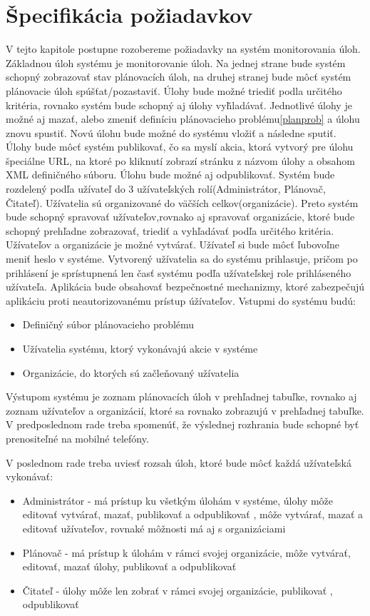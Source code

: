 \section{Špecifikácia požiadavkov}
V tejto kapitole postupne rozobereme požiadavky na systém monitorovania úloh. Základnou úloh systému je monitorovanie úloh. Na jednej strane bude systém schopný zobrazovať stav plánovacích úloh, na druhej stranej bude môcť systém plánovacie úloh spúšťat/pozastaviť. Úlohy bude možné triediť podla určitého kritéria, rovnako systém bude schopný aj úlohy vyȟladávať. Jednotlivé úlohy je možné aj mazať, alebo zmeniť definíciu plánovacieho problému\ref{planprob} a úlohu znovu spustiť. Novú úlohu bude možné do systému vložiť a následne sputiť. Úlohy bude môcť systém publikovať, čo sa myslí akcia, ktorá vytvorý pre úlohu špeciálne URL, na ktoré po kliknutí zobrazí stránku z názvom úlohy a obsahom XML definičného súboru. Úlohu bude možné aj odpublikovať.
 Systém bude rozdelený podľa užívateľ do 3 užívateľských rolí(Administrátor, Plánovač, Čitateľ). Užívatelia sú organizované do väčších celkov(organizácie). Preto systém bude schopný spravovať užívateľov,rovnako aj spravovať organizácie, ktoré bude schopný prehľadne zobrazovať, triediť a vyhľadávať podľa určitého kritéria. Užívateľov a organizácie je možné vytvárať. Užívateľ si bude môcť ľubovoľne meniť heslo v systéme. Vytvorený užívatelia sa do systému prihlasuje, pričom po prihlásení je sprístupnená len časť systému podľa užívateľskej role prihláseného užívateľa. Aplikácia bude obsahovať bezpečnostné mechanizmy, ktoré zabezpečujú aplikáciu proti neautorizovanému prístup úžívateľov. Vstupmi do systému budú:\begin{itemize}
\item Definičný súbor plánovacieho problému
\item Užívatelia systému, ktorý vykonávajú akcie v systéme
\item Organizácie, do ktorých sú začleňovaný užívatelia
\end{itemize}
Výstupom systému je zoznam plánovacích úloh v prehľadnej tabuľke, rovnako aj zoznam užívateľov a organizácií, ktoré sa rovnako zobrazujú v prehľadnej tabuľke. V predposlednom rade treba spomenúť, že výslednej rozhrania bude schopné byť prenositeľné na mobilné telefóny. 

V poslednom rade treba uviesť rozsah úloh, ktoré bude môcť každá užívateľská vykonávať:
\begin{itemize}
\item Administrátor - má prístup ku všetkým úlohám v systéme, úlohy môže editovať vytvárať, mazať, publikovať a odpublikovať , môže vytvárať, mazať a editovať užívateľov, rovnaké môžnosti má aj s organizáciami
\item Plánovač - má prístup k úlohám v rámci svojej organizácie, môže vytvárať, editovať, mazať úlohy, publikovať a odpublikovať
\item Čitateľ - úlohy môže len zobrať v rámci svojej organizácie, publikovať , odpublikovať
\end{itemize}

